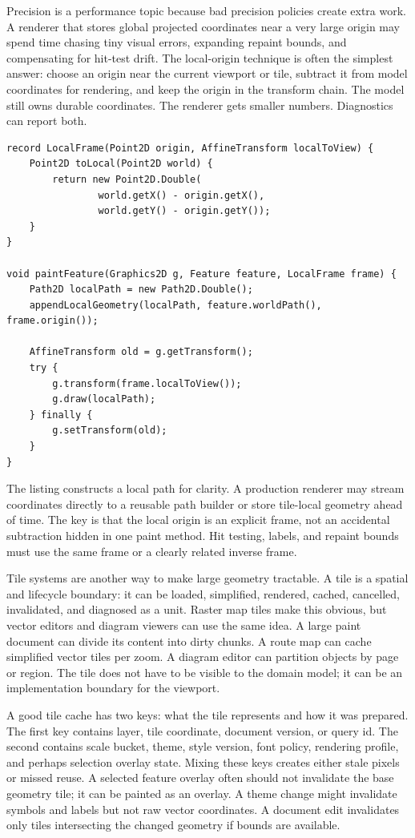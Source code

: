 Precision is a performance topic because bad precision policies create extra work. A renderer that stores global projected coordinates near a very large origin may spend time chasing tiny visual errors, expanding repaint bounds, and compensating for hit-test drift. The local-origin technique is often the simplest answer: choose an origin near the current viewport or tile, subtract it from model coordinates for rendering, and keep the origin in the transform chain. The model still owns durable coordinates. The renderer gets smaller numbers. Diagnostics can report both.

\begin{lstlisting}[caption={Rendering large world coordinates through a local origin.}]
record LocalFrame(Point2D origin, AffineTransform localToView) {
    Point2D toLocal(Point2D world) {
        return new Point2D.Double(
                world.getX() - origin.getX(),
                world.getY() - origin.getY());
    }
}

void paintFeature(Graphics2D g, Feature feature, LocalFrame frame) {
    Path2D localPath = new Path2D.Double();
    appendLocalGeometry(localPath, feature.worldPath(), frame.origin());

    AffineTransform old = g.getTransform();
    try {
        g.transform(frame.localToView());
        g.draw(localPath);
    } finally {
        g.setTransform(old);
    }
}
\end{lstlisting}

The listing constructs a local path for clarity. A production renderer may stream coordinates directly to a reusable path builder or store tile-local geometry ahead of time. The key is that the local origin is an explicit frame, not an accidental subtraction hidden in one paint method. Hit testing, labels, and repaint bounds must use the same frame or a clearly related inverse frame.

Tile systems are another way to make large geometry tractable. A tile is a spatial and lifecycle boundary: it can be loaded, simplified, rendered, cached, cancelled, invalidated, and diagnosed as a unit. Raster map tiles make this obvious, but vector editors and diagram viewers can use the same idea. A large paint document can divide its content into dirty chunks. A route map can cache simplified vector tiles per zoom. A diagram editor can partition objects by page or region. The tile does not have to be visible to the domain model; it can be an implementation boundary for the viewport.

A good tile cache has two keys: what the tile represents and how it was prepared. The first key contains layer, tile coordinate, document version, or query id. The second contains scale bucket, theme, style version, font policy, rendering profile, and perhaps selection overlay state. Mixing these keys creates either stale pixels or missed reuse. A selected feature overlay often should not invalidate the base geometry tile; it can be painted as an overlay. A theme change might invalidate symbols and labels but not raw vector coordinates. A document edit invalidates only tiles intersecting the changed geometry if bounds are available.

